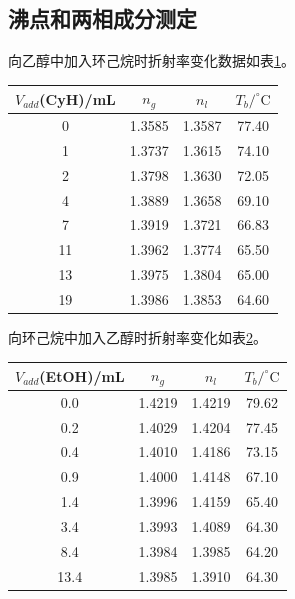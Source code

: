 \documentclass[12pt]{article}
\newcommand{\mr}[1]{\mathrm{#1}}
\def\celsius{^{\circ}\mr{C}}  %
\begin{document}
 		\subsection{沸点和两相成分测定}
		\par 
		向乙醇中加入环己烷时折射率变化数据如表\ref{add CyH to EtOH n}。
 		\begin{table}[h]
 			\centering
 			\begin{tabular}{cccc}
 				\toprule
				$V_{add}$(CyH)/mL & $n_{g}$ & $n_l$ & $T_b/\celsius$ \\
 				\midrule
				0  & 1.3585 & 1.3587 & 77.40 \\
				1  & 1.3737 & 1.3615 & 74.10 \\
				2  & 1.3798 & 1.3630 & 72.05 \\
				4  & 1.3889 & 1.3658 & 69.10 \\
				7  & 1.3919 & 1.3721 & 66.83 \\
				11 & 1.3962 & 1.3774 & 65.50 \\
				13 & 1.3975 & 1.3804 & 65.00 \\
				19 & 1.3986 & 1.3853 & 64.60 \\
 				\bottomrule
 			\end{tabular}
			 \label{add CyH to EtOH n}
 		\end{table}
		\par 
		向环己烷中加入乙醇时折射率变化如表\ref{add EtOH to CyH n}。
		\begin{table}[h]
			\centering
			\begin{tabular}{cccc}
				\toprule
			   $V_{add}$(EtOH)/mL & $n_{g}$ & $n_l$ & $T_b/\celsius$ \\
				\midrule
			   0.0  & 1.4219 & 1.4219 & 79.62 \\
			   0.2  & 1.4029 & 1.4204 & 77.45 \\
			   0.4  & 1.4010 & 1.4186 & 73.15 \\
			   0.9  & 1.4000 & 1.4148 & 67.10 \\
			   1.4  & 1.3996 & 1.4159 & 65.40 \\
			   3.4  & 1.3993 & 1.4089 & 64.30 \\
			   8.4  & 1.3984 & 1.3985 & 64.20 \\
			   13.4 & 1.3985 & 1.3910 & 64.30 \\
				\bottomrule
			\end{tabular}
			\label{add EtOH to CyH n}
		\end{table}
 		\vbox{}
\end{document}
